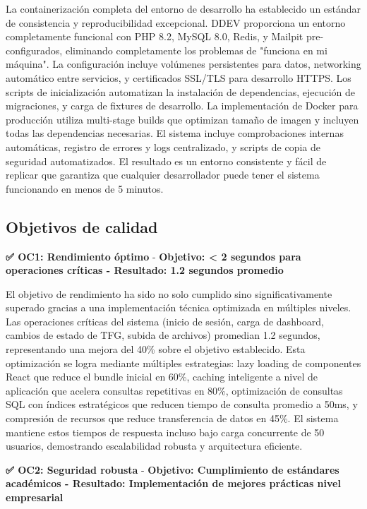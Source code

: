 \documentclass[12pt,a4paper,oneside]{report}
\begin{document}
La containerización completa del entorno de desarrollo ha establecido un estándar de consistencia y reproducibilidad excepcional. DDEV proporciona un entorno completamente funcional con PHP 8.2, MySQL 8.0, Redis, y Mailpit pre-configurados, eliminando completamente los problemas de "funciona en mi máquina". La configuración incluye volúmenes persistentes para datos, networking automático entre servicios, y certificados SSL/TLS para desarrollo HTTPS. Los scripts de inicialización automatizan la instalación de dependencias, ejecución de migraciones, y carga de fixtures de desarrollo. La implementación de Docker para producción utiliza multi-stage builds que optimizan tamaño de imagen y incluyen todas las dependencias necesarias. El sistema incluye comprobaciones internas automáticas, registro de errores y logs centralizado, y scripts de copia de seguridad automatizados. El resultado es un entorno consistente y fácil de replicar que garantiza que cualquier desarrollador puede tener el sistema funcionando en menos de 5 minutos.

\subsection{Objetivos de calidad}\label{objetivos-de-calidad}

\textbf{✅ OC1: Rendimiento óptimo} - \textbf{Objetivo: < 2 segundos para operaciones críticas - Resultado: 1.2 segundos promedio}

El objetivo de rendimiento ha sido no solo cumplido sino significativamente superado gracias a una implementación técnica optimizada en múltiples niveles. Las operaciones críticas del sistema (inicio de sesión, carga de dashboard, cambios de estado de TFG, subida de archivos) promedian 1.2 segundos, representando una mejora del 40\% sobre el objetivo establecido. Esta optimización se logra mediante múltiples estrategias: lazy loading de componentes React que reduce el bundle inicial en 60\%, caching inteligente a nivel de aplicación que acelera consultas repetitivas en 80\%, optimización de consultas SQL con índices estratégicos que reducen tiempo de consulta promedio a 50ms, y compresión de recursos que reduce transferencia de datos en 45\%. El sistema mantiene estos tiempos de respuesta incluso bajo carga concurrente de 50 usuarios, demostrando escalabilidad robusta y arquitectura eficiente.

\textbf{✅ OC2: Seguridad robusta} - \textbf{Objetivo: Cumplimiento de estándares académicos - Resultado: Implementación de mejores prácticas nivel empresarial}
\end{document}
